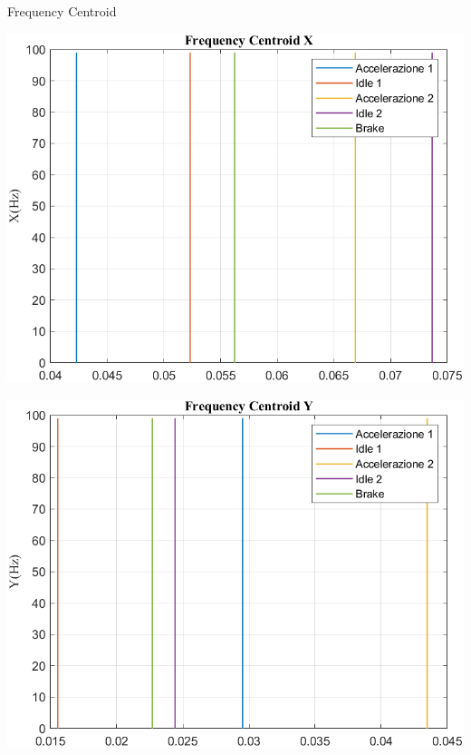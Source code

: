 \documentclass[beamer]{standalone}
\begin{document}
	\begin{frame}{{Frequency Centroid}}
		\begin{minipage}{.45\textwidth}
			\centering\includegraphics[width=.9\textwidth]{figure/Vel/Trasformata/Frequency CentroidX}
		\end{minipage}
		\hspace{.05\textwidth}
		\begin{minipage}{.45\textwidth}
			\centering\includegraphics[width=.9\textwidth]{figure/Vel/Trasformata/Frequency CentroidY}
		\end{minipage}
	\end{frame}
	
\end{document}

